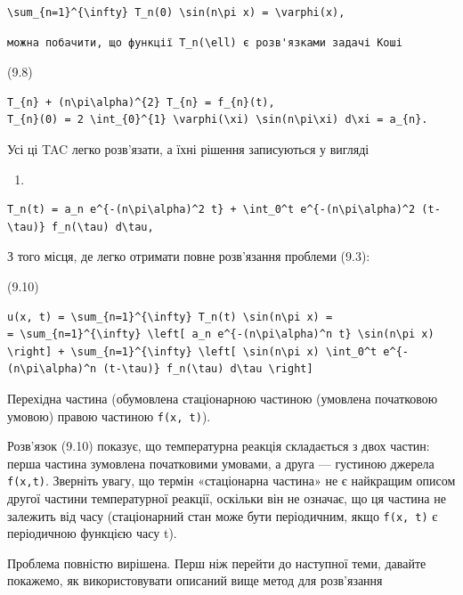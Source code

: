 \documentclass[
  ukrainian,
]{article}
\providecommand{\tightlist}{%
  \setlength{\itemsep}{0pt}\setlength{\parskip}{0pt}}
\begin{document}
\begin{verbatim}
\sum_{n=1}^{\infty} T_n(0) \sin(n\pi x) = \varphi(x),
\end{verbatim}

\begin{verbatim}
можна побачити, що функції T_n(\ell) є розв'язками задачі Коші
\end{verbatim}

(9.8)

\begin{verbatim}
T_{n} + (n\pi\alpha)^{2} T_{n} = f_{n}(t),
T_{n}(0) = 2 \int_{0}^{1} \varphi(\xi) \sin(n\pi\xi) d\xi = a_{n}.
\end{verbatim}

Усі ці TAC легко розв'язати, а їхні рішення записуються у вигляді

\begin{enumerate}
\def\labelenumi{(\arabic{enumi})}
\setcounter{enumi}{98}
\tightlist
\item
\end{enumerate}

\begin{verbatim}
T_n(t) = a_n e^{-(n\pi\alpha)^2 t} + \int_0^t e^{-(n\pi\alpha)^2 (t-\tau)} f_n(\tau) d\tau,
\end{verbatim}

З того місця, де легко отримати повне розв'язання проблеми (9.3):

(9.10)

\begin{verbatim}
u(x, t) = \sum_{n=1}^{\infty} T_n(t) \sin(n\pi x) =
= \sum_{n=1}^{\infty} \left[ a_n e^{-(n\pi\alpha)^n t} \sin(n\pi x) \right] + \sum_{n=1}^{\infty} \left[ \sin(n\pi x) \int_0^t e^{-(n\pi\alpha)^n (t-\tau)} f_n(\tau) d\tau \right]
\end{verbatim}

Перехідна частина (обумовлена стаціонарною частиною (умовлена початковою
умовою) правою частиною \texttt{f(x,\ t)}).

Розв'язок (9.10) показує, що температурна реакція складається з двох
частин: перша частина зумовлена початковими умовами, а друга ---
густиною джерела \texttt{f(x,t)}. Зверніть увагу, що термін «стаціонарна
частина» не є найкращим описом другої частини температурної реакції,
оскільки він не означає, що ця частина не залежить від часу
(стаціонарний стан може бути періодичним, якщо \texttt{f(x,\ t)} є
періодичною функцією часу t).

Проблема повністю вирішена. Перш ніж перейти до наступної теми, давайте
покажемо, як використовувати описаний вище метод для розв'язання
\end{document}
